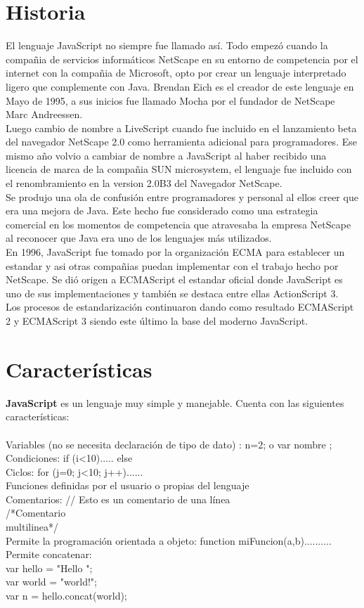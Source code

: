 \documentclass[11pt]{article} %
\begin{document}
\section{Historia}
El lenguaje JavaScript no siempre fue llamado así. Todo empezó cuando la compañia de servicios informáticos NetScape en su entorno de competencia por el internet con la compañia de Microsoft, opto por crear un lenguaje interpretado ligero que complemente con Java. Brendan Eich es el creador de este lenguaje en Mayo de 1995, a sus inicios fue llamado Mocha por el fundador de NetScape Marc Andreessen.\\
Luego cambio de nombre a LiveScript cuando fue incluido en el lanzamiento beta del navegador NetScape 2.0 como herramienta adicional para programadores. Ese mismo año volvio a cambiar de nombre a JavaScript al haber recibido una licencia de marca de la compañia SUN microsystem, el lenguaje fue incluido con el renombramiento en la version 2.0B3 del Navegador NetScape.\\
Se produjo una ola de confusión entre programadores y personal al ellos creer que era una mejora de Java. Este hecho fue considerado como una estrategia comercial en los momentos de competencia que atravesaba la empresa NetScape al reconocer que Java era uno de los lenguajes más utilizados.\\
En 1996, JavaScript fue tomado por la organización ECMA para establecer un estandar y asi otras compañias puedan implementar con el trabajo hecho por NetScape. Se dió origen a ECMAScript el estandar oficial donde JavaScript es uno de sus implementaciones y también se destaca entre ellas ActionScript 3.\\
Los procesos de estandarización continuaron dando como resultado ECMAScript 2 y ECMAScript 3 siendo este último la base del moderno JavaScript.\\

\section{Características}
{\bfseries JavaScript} es un lenguaje muy simple y manejable. Cuenta con las siguientes características:\\\\
Variables (no se necesita declaración de tipo de dato) : n=2; o var nombre ;\\
Condiciones: if (i<10){.....} else{}\\
Ciclos: for (j=0; j<10; j++){......}\\
Funciones definidas por el usuario o propias del lenguaje\\
Comentarios: // Esto es un comentario de una línea\\
/*Comentario\\
multilinea*/   \\
Permite la programación orientada a objeto: function miFuncion(a,b){..........} \\
Permite concatenar:\\
var hello = "Hello "; \\
var world = "world!";\\
var n = hello.concat(world);
\end{document}
